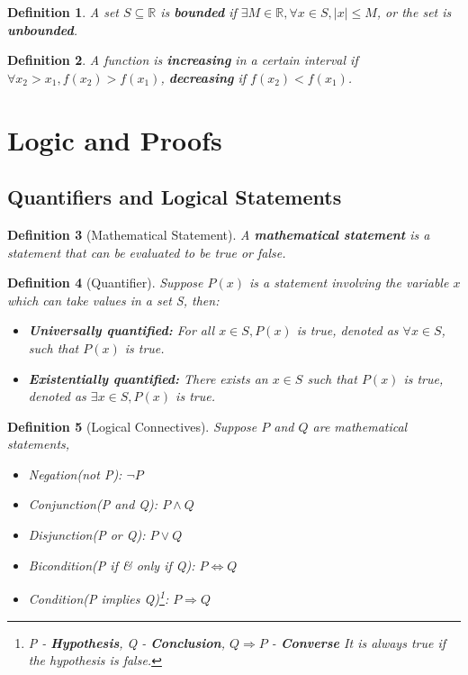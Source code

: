 \documentclass[12pt]{article}
\newtheorem{definition}{Definition}[subsection]
\begin{document}
        \begin{definition}
            A set $S \subseteq \mathbb{R}$ is \textbf{bounded} if $\exists M \in \mathbb{R}, \forall x \in S, |x| \leq M$, or the set is \textbf{unbounded}.
        \end{definition}
        
        \begin{definition}
            A function is \textbf{increasing} in a certain interval if $\forall x_2 > x_1, f(x_2) > f(x_1)$, \textbf{decreasing} if $f(x_2) < f(x_1)$.
        \end{definition}

\section{Logic and Proofs}
    \subsection{Quantifiers and Logical Statements}
    \begin{definition}[Mathematical Statement]
        A \textbf{mathematical statement} is a statement that can be evaluated to be true or false.
    \end{definition}
    
    \begin{definition}[Quantifier]
        Suppose $P(x)$ is a statement involving  the variable $x$ which can take values in a set S, then:
        \begin{itemize}
            \item \textbf{Universally quantified:} For all $x \in S, P(x)$ is true, denoted as $\forall x \in S$, such that $P(x)$ is true.
            \item \textbf{Existentially quantified:} There exists an $x \in S$ such that $P(x)$ is true, denoted as $\exists x \in S, P(x)$ is true.
        \end{itemize}
    \end{definition}
    
    \begin{definition}[Logical Connectives] Suppose $P$ and $Q$ are mathematical statements,
        \begin{itemize}
            \item Negation(not P): $\neg P$
            \item Conjunction(P and Q): $P \wedge Q$
            \item Disjunction(P or Q): $P \vee Q$
            \item Bicondition(P if \& only if Q): $P \Leftrightarrow Q$
            \item Condition(P implies Q)\footnote{P - \textbf{Hypothesis}, Q - \textbf{Conclusion}, $Q \Rightarrow P$ - \textbf{Converse} It is always true if the hypothesis is false.}: $P \Rightarrow Q$
        \end{itemize}

    \end{definition}
    
\end{document}
